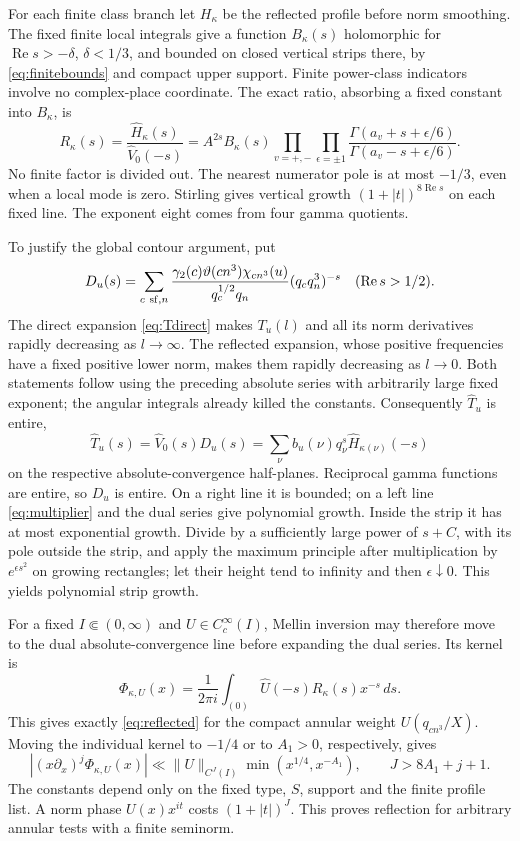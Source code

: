 \documentclass[11pt,a4paper]{article}
\numberwithin{equation}{section}
\theoremstyle{definition}
\theoremstyle{remark}
\newcommand{\dd}{\,d}
\newcommand{\Rea}{\operatorname{Re}}
\newcommand{\wt}{\widehat}
\begin{document}
For each finite class branch let $H_\kappa$ be the reflected profile before norm smoothing. The fixed finite local integrals give a function $B_\kappa(s)$ holomorphic for $\Rea s>-\delta$, $\delta<1/3$, and bounded on closed vertical strips there, by \eqref{eq:finitebounds} and compact upper support. Finite power-class indicators involve no complex-place coordinate. The exact ratio, absorbing a fixed constant into $B_\kappa$, is
\begin{equation}\label{eq:multiplier}
 R_\kappa(s)=\frac{\wt H_\kappa(s)}{\wt V_0(-s)}
 =A^{2s}B_\kappa(s)
 \prod_{v=+,-}\prod_{\epsilon=\pm1}
 \frac{\Gamma(a_v+s+\epsilon/6)}{\Gamma(a_v-s+\epsilon/6)}.
\end{equation}
No finite factor is divided out. The nearest numerator pole is at most $-1/3$, even when a local mode is zero. Stirling gives vertical growth $(1+|t|)^{8\Rea s}$ on each fixed line. The exponent eight comes from four gamma quotients.

To justify the global contour argument, put
\[
 D_u(s)=\sum_{c\ {\rm sf},n}
 \frac{\gamma_2(c)\vartheta(cn^3)\chi_{cn^3}(u)}
      {q_c^{1/2}q_n}(q_cq_n^3)^{-s}\quad(\Rea s>1/2).
\]
The direct expansion \eqref{eq:Tdirect} makes $T_u(l)$ and all its norm derivatives rapidly decreasing as $l\to\infty$. The reflected expansion, whose positive frequencies have a fixed positive lower norm, makes them rapidly decreasing as $l\to0$. Both statements follow using the preceding absolute series with arbitrarily large fixed exponent; the angular integrals already killed the constants. Consequently $\wt T_u$ is entire,
\[
 \wt T_u(s)=\wt V_0(s)D_u(s)
          =\sum_\nu b_u(\nu)q_\nu^s\wt H_{\kappa(\nu)}(-s)
\]
on the respective absolute-convergence half-planes. Reciprocal gamma functions are entire, so $D_u$ is entire. On a right line it is bounded; on a left line \eqref{eq:multiplier} and the dual series give polynomial growth. Inside the strip it has at most exponential growth. Divide by a sufficiently large power of $s+C$, with its pole outside the strip, and apply the maximum principle after multiplication by $e^{\epsilon s^2}$ on growing rectangles; let their height tend to infinity and then $\epsilon\downarrow0$. This yields polynomial strip growth.

For a fixed $I\Subset(0,\infty)$ and $U\in C_c^\infty(I)$, Mellin inversion may therefore move to the dual absolute-convergence line before expanding the dual series. Its kernel is
\begin{equation}\label{eq:annularkernel}
 \Phi_{\kappa,U}(x)=\frac1{2\pi i}\int_{(0)}
                \wt U(-s)R_\kappa(s)x^{-s}\dd s.
\end{equation}
This gives exactly \eqref{eq:reflected} for the compact annular weight $U(q_{cn^3}/X)$. Moving the individual kernel to $-1/4$ or to $A_1>0$, respectively, gives
\begin{equation}\label{eq:annulardecay}
 |(x\partial_x)^j\Phi_{\kappa,U}(x)|
 \ll\|U\|_{C^J(I)}\min(x^{1/4},x^{-A_1}),
 \qquad J>8A_1+j+1.
\end{equation}
The constants depend only on the fixed type, $S$, support and the finite profile list. A norm phase $U(x)x^{it}$ costs $(1+|t|)^J$. This proves reflection for arbitrary annular tests with a finite seminorm.
\end{document}
